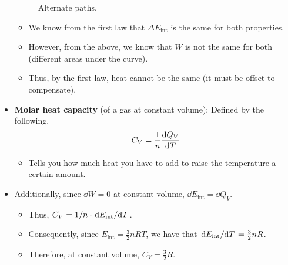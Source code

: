 \documentclass[../notes.tex]{subfiles}
\begin{document}
\begin{itemize}
\begin{figure}[H]
        \caption{Alternate paths.}
        \label{fig:alternatePaths}
    \end{figure}
    \begin{itemize}
        \item We know from the first law that $\Delta E_\text{int}$ is the same for both properties.
        \item However, from the above, we know that $W$ is not the same for both (different areas under the curve).
        \item Thus, by the first law, heat cannot be the same (it must be offset to compensate).
    \end{itemize}
    \item \textbf{Molar heat capacity} (of a gas at constant volume): Defined by the following.
    \begin{equation*}
        C_V = \frac{1}{n}\dv{Q_V}{T}
    \end{equation*}
    \begin{itemize}
        \item Tells you how much heat you have to add to raise the temperature a certain amount.
    \end{itemize}
    \item Additionally, since $\dd{W}=0$ at constant volume, $\dd{E_\text{int}}=\dd{Q_V}$.
    \begin{itemize}
        \item Thus, $C_V=1/n\cdot\dv*{E_\text{int}}{T}$.
        \item Consequently, since $E_\text{int}=\frac{3}{2}nRT$, we have that $\dv*{E_\text{int}}{T}=\frac{3}{2}nR$.
        \item Therefore, at constant volume, $C_V=\frac{3}{2}R$.

\end{itemize}
\end{itemize}
\end{document}

